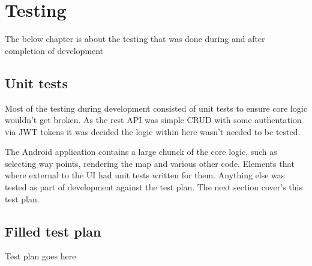 \section{Testing}
The below chapter is about the testing that was done during and after completion of development

\subsection{Unit tests}
Most of the testing during development consisted of unit tests to ensure core logic wouldn't get broken. As the rest API was simple CRUD with some authentation via JWT tokens it was decided the logic within here wasn't needed to be tested. 

The Android application contains a large chunck of the core logic, such as selecting way points, rendering the map and various other code. Elements that where external to the UI had unit tests written for them. Anything else was tested as part of development against the test plan. The next section cover's this test plan.

\subsection{Filled test plan}
Test plan goes here